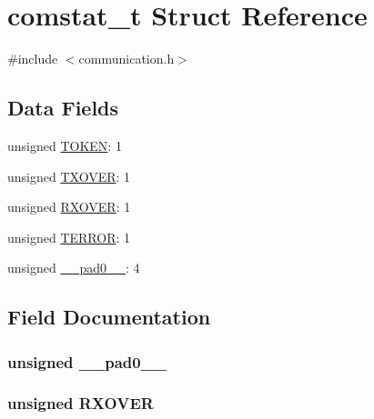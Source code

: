 \hypertarget{structcomstat__t}{}\section{comstat\+\_\+t Struct Reference}
\label{structcomstat__t}


{\ttfamily \#include $<$communication.\+h$>$}

\subsection*{Data Fields}
\begin{DoxyCompactItemize}
\item 
unsigned \hyperlink{structcomstat__t_a286e5d66a5e535c50a8b89c9d4870370}{T\+O\+K\+E\+N}\+: 1
\item 
unsigned \hyperlink{structcomstat__t_a008f2e947c6ef85c19ebd817436ae178}{T\+X\+O\+V\+E\+R}\+: 1
\item 
unsigned \hyperlink{structcomstat__t_aaeb85551df9d078c5e89a1e210072572}{R\+X\+O\+V\+E\+R}\+: 1
\item 
unsigned \hyperlink{structcomstat__t_a6280d63145bb20f921aed12654cca74b}{T\+E\+R\+R\+O\+R}\+: 1
\item 
unsigned \hyperlink{structcomstat__t_adf71f3d8410c1f1dbbc96680a92c49af}{\+\_\+\+\_\+pad0\+\_\+\+\_\+}\+: 4
\end{DoxyCompactItemize}


\subsection{Field Documentation}
\hypertarget{structcomstat__t_adf71f3d8410c1f1dbbc96680a92c49af}{}
\subsubsection[{\+\_\+\+\_\+pad0\+\_\+\+\_\+}]{\setlength{\rightskip}{0pt plus 5cm}unsigned \+\_\+\+\_\+pad0\+\_\+\+\_\+}\label{structcomstat__t_adf71f3d8410c1f1dbbc96680a92c49af}
\hypertarget{structcomstat__t_aaeb85551df9d078c5e89a1e210072572}{}
\subsubsection[{R\+X\+O\+V\+E\+R}]{\setlength{\rightskip}{0pt plus 5cm}unsigned R\+X\+O\+V\+E\+R}\label{structcomstat__t_aaeb85551df9d078c5e89a1e210072572}
\hypertarget{structcomstat__t_a6280d63145bb20f921aed12654cca74b}{}
